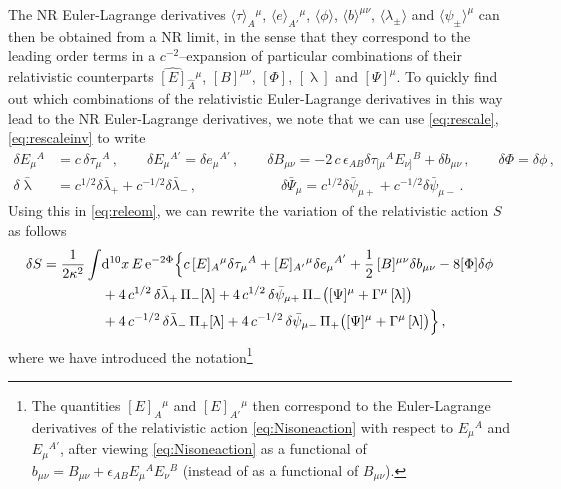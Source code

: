 \documentclass[a4paper,10pt,openany]{article}
\def\rme{\mathrm{e}}
\def\rmd{\mathrm{d}}
\begin{document}
	The NR Euler-Lagrange derivatives $\langle \tau \rangle_A{}^\mu$, $\langle e \rangle_{A'}{}^\mu$, $\langle \phi \rangle$, $\langle b \rangle^{\mu\nu}$, $\langle \lambda_\pm \rangle$ and $\langle \psi_\pm \rangle^\mu$ can then be obtained from a NR limit, in the sense that they correspond to the leading order terms in a $c^{-2}$--expansion of particular combinations of their relativistic counterparts $\widehat{[E]}_{\hat{A}}{}^{\mu}$, $[B]^{\mu\nu}$, $[\Phi]$, $[\uplambda]$ and $[\Psi]^\mu$. To quickly find out which combinations of the relativistic Euler-Lagrange derivatives in this way lead to the NR Euler-Lagrange derivatives, we note that we can use \eqref{eq:rescale}, \eqref{eq:rescaleinv} to write
	\begin{align}
		\delta E_\mu{}^A &= c\, \delta \tau_{\mu}{}^A \,,  \qquad \delta E_\mu{}^{A'} = \delta e_\mu{}^{A'} \,, \qquad \delta B_{\mu\nu} = -2\, c\, \epsilon_{AB} \delta \tau_{[\mu}{}^A E_{\nu]}{}^B + \delta b_{\mu\nu} \,, \qquad \delta \Phi = \delta \phi \,, \nonumber \\
		\delta \bar{\uplambda} &= c^{1/2} \delta \bar{\lambda}_+ + c^{-1/2} \delta \bar{\lambda}_- \,,  \qquad \qquad \qquad \delta \bar{\Psi}_\mu = c^{1/2} \delta \bar{\psi}_{\mu +} + c^{-1/2} \delta \bar{\psi}_{\mu -} \,.
	\end{align}
	Using this in \eqref{eq:releom}, we can rewrite the variation of the relativistic action $S$ as follows
	\begin{align}\label{eq:releom2}
		\delta S = \frac{1}{2\kappa^2}\int & \rmd^{10}x \,E\,\rme^{-2\Phi}\Big\{ c\, [E]_A{}^\mu \delta \tau_\mu{}^A  + [E]_{A'}{}^\mu \delta e_\mu{}^{A'}  + \frac12\,[B]^{\mu\nu}\delta b_{\mu\nu}  - 8[\Phi]\delta\phi \notag\\
		& + 4\,c^{1/2}\, \delta\bar\lambda_+ \,\Pi_- [\uplambda] +4\, c^{1/2}\, \delta\bar\psi_{\mu +}\, \Pi_- \big([\Psi]^\mu + \Gamma^\mu\,[\uplambda]\big) \notag \\ &+ 4\,c^{-1/2}\, \delta\bar\lambda_- \,\Pi_+[\uplambda] + 4\, c^{-1/2}\, \delta\bar\psi_{\mu -} \,\Pi_+ \big([\Psi]^\mu + \Gamma^\mu\,[\uplambda]\big) \Big\}\,,
	\end{align}
	where we have introduced the notation\footnote{The quantities $[E]_A{}^\mu$ and $[E]_{A'}{}^\mu$ then correspond to the Euler-Lagrange derivatives of the relativistic action \eqref{eq:Nisoneaction} with respect to $E_\mu{}^A$ and $E_\mu{}^{A'}$, after viewing \eqref{eq:Nisoneaction} as a functional of $b_{\mu\nu} = B_{\mu\nu} + \epsilon_{AB} E_\mu{}^A E_\nu{}^B$ (instead of as a functional of $B_{\mu\nu}$).}
\end{document}
